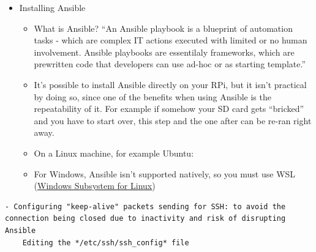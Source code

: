 \begin{itemize}
\item
  Installing Ansible

  \begin{itemize}
  \item
    What is Ansible? ``An Ansible playbook is a blueprint of automation
    tasks - which are complex IT actions executed with limited or no
    human involvement. Ansible playbooks are essentilaly frameworks,
    which are prewritten code that developers can use ad-hoc or as
    starting template.''
  \item
    It's possible to install Ansible directly on your RPi, but it isn't
    practical by doing so, since one of the benefits when using Ansible
    is the repeatability of it. For example if somehow your SD card gets
    ``bricked'' and you have to start over, this step and the one after
    can be re-ran right away.
  \item
    On a Linux machine, for example Ubuntu:
  \end{itemize}

\begin{Shaded}
\begin{Highlighting}[]
\ExtensionTok{$}
\ExtensionTok{$}
\end{Highlighting}
\end{Shaded}

  \begin{itemize}
  \tightlist
  \item
    For Windows, Ansible isn't supported natively, so you must use WSL
    (\href{https://docs.microsoft.com/en-us/windows/wsl/install}{Windows
    Subsystem for Linux})
  \end{itemize}
\end{itemize}

\pagebreak

\begin{verbatim}
- Configuring "keep-alive" packets sending for SSH: to avoid the connection being closed due to inactivity and risk of disrupting Ansible
    Editing the */etc/ssh/ssh_config* file
\end{verbatim}

\begin{Shaded}
\begin{Highlighting}[]
\end{Highlighting}
\end{Shaded}

